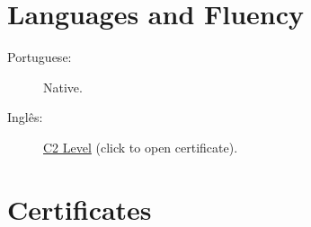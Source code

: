 \documentclass[letterpaper]{../cls/twentysecondcvenglish} %
\begin{document}
\vspace{5mm}
\section{Languages and Fluency}

\begin{description}
\item[Portuguese:] Native.
\item[Inglês:] \href{https://www.efset.org/cert/hqg62J}{C2 Level} (click to open certificate).
\end{description}

\vspace{0.2cm}







\newpage %

\makeprofileNoExtra %

\section{\LARGE{Certificates}}
\end{document}
